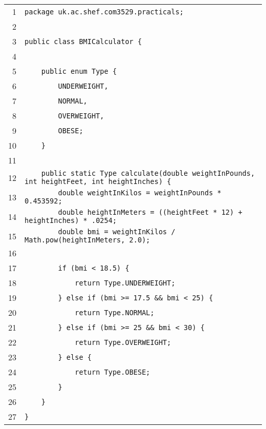 \begin{center} 
    \scriptsize
    \begin{tabular}{rl}
        \toprule
        1 & \verb$package uk.ac.shef.com3529.practicals;$\\
        2 & \verb$$\\
        3 & \verb$public class BMICalculator {$\\
        4 & \verb$$\\
        5 & \verb$    public enum Type {$\\
        6 & \verb$        UNDERWEIGHT,$\\
        7 & \verb$        NORMAL,$\\
        8 & \verb$        OVERWEIGHT,$\\
        9 & \verb$        OBESE;$\\
        10 & \verb$    }$\\
        11 & \verb$$\\
        12 & \verb$    public static Type calculate(double weightInPounds, int heightFeet, int heightInches) {$\\
        13 & \verb$        double weightInKilos = weightInPounds * 0.453592;$\\
        14 & \verb$        double heightInMeters = ((heightFeet * 12) + heightInches) * .0254;$\\
        15 & \verb$        double bmi = weightInKilos / Math.pow(heightInMeters, 2.0);$\\
        16 & \verb$$\\
        17 & \verb$        if (bmi < 18.5) {$\\
        18 & \verb$            return Type.UNDERWEIGHT;$\\
        19 & \verb$        } else if (bmi >= 17.5 && bmi < 25) {$\\
        20 & \verb$            return Type.NORMAL;$\\
        21 & \verb$        } else if (bmi >= 25 && bmi < 30) {$\\
        22 & \verb$            return Type.OVERWEIGHT;$\\
        23 & \verb$        } else {$\\
        24 & \verb$            return Type.OBESE;$\\
        25 & \verb$        }$\\
        26 & \verb$    }$\\
        27 & \verb$}$\\
        \bottomrule
    \end{tabular}
\end{center}

